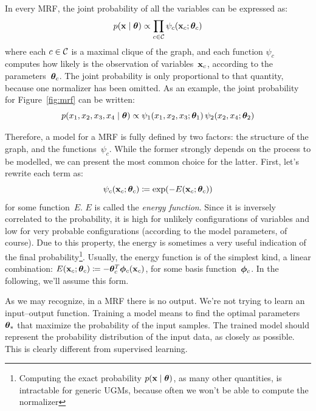 In every MRF, the joint probability of all the variables can be expressed as:
\begin{equation}
	p(\mathbf{x} \mid \bm{\theta}) \propto
		\prod_{c \in \mathcal{C}} \psi_c(\mathbf{x}_c; \bm{\theta}_c)
\end{equation}
where each $c \in \mathcal{C}$ is a maximal clique of the graph, and each
function $\psi_c$ computes how likely is the observation of variables~$\mathbf{x}_c$,
according to the parameters~$\bm{\theta}_c$. The joint probability is only
proportional to that quantity, because one normalizer has been omitted. As an
example, the joint probability for Figure~\ref{fig:mrf} can be written:
\[
	p(x_1, x_2, x_3, x_4 \mid \bm{\theta}) \propto
	\psi_1(x_1, x_2, x_3; \bm{\theta}_1) \, \psi_2(x_2, x_4; \bm{\theta}_2)
\]

Therefore, a model for a MRF is fully defined by two factors: the structure of
the graph, and the functions~$\psi_c$. While the former strongly depends on
the process to be modelled, we can present the most common choice for the
latter. First, let's rewrite each term as:
\begin{equation}
	\psi_c(\mathbf{x}_c; \bm{\theta}_c) \coloneqq \exp(-E(\mathbf{x}_c; \bm{\theta}_c))
	\label{eq:ugm-energy-based}
\end{equation}
for some function~$E$. $E$ is called the \emph{energy function}. Since it is
inversely correlated to the probability, it is high for unlikely
configurations of variables and low for very probable configurations
(according to the model parameters, of course). Due to this property, the
energy is sometimes a very useful indication of the final
probability\footnote{Computing the exact probability $p(\mathbf{x} \mid \bm{\theta})$,
as many other quantities, is intractable for generic UGMs, because often we
won't be able to compute the normalizer}.  Usually, the energy function is of
the simplest kind, a linear combination: $E(\mathbf{x}_c; \bm{\theta}_c) \coloneqq
-\bm{\theta}_c^T \bm{\phi}_c(\mathbf{x}_c)$, for some basis function~$\bm{\phi}_c$. In the
following, we'll assume this form.

As we may recognize, in a MRF there is no output. We're not trying to learn an
input--output function. Training a model means to find the optimal parameters
${\bm{\theta}}_*$ that maximize the probability of the input samples. The
trained model should represent the probability distribution of the input data,
as closely as possible. This is clearly different from supervised learning.

